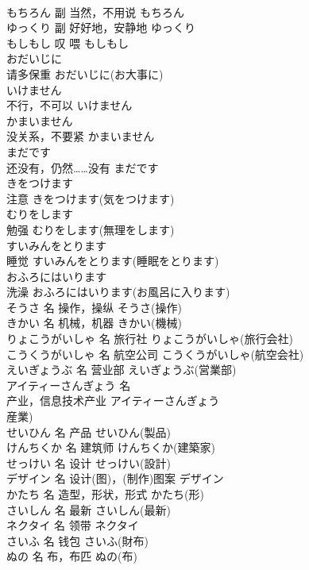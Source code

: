 \documentclass[8pt]{extreport}
\begin{document}
\begin{CJK}{UTF8}{min}
\\	もちろん	副	当然，不用说	もちろん	
\\	ゆっくり	副	好好地，安静地	ゆっくり	
\\	もしもし	叹	喂	もしもし	
\\	おだいじに	
\\	请多保重	おだいじに(お大事に)	
\\	いけません	
\\	不行，不可以	いけません	
\\	かまいません	
\\	没关系，不要紧	かまいません	
\\	まだです	
\\	还没有，仍然……没有	まだです	
\\	きをつけます	
\\	注意	きをつけます(気をつけます)	
\\	むりをします	
\\	勉强	むりをします(無理をします)	
\\	すいみんをとります	
\\	睡觉	すいみんをとります(睡眠をとります)	
\\	おふろにはいります	
\\	洗澡	おふろにはいります(お風呂に入ります)	
\\	そうさ	名	操作，操纵	そうさ(操作)	
\\	きかい	名	机械，机器	きかい(機械)	
\\	りょこうがいしゃ	名	旅行社	りょこうがいしゃ(旅行会社)	
\\	こうくうがいしゃ	名	航空公司	こうくうがいしゃ(航空会社)	
\\	えいぎょうぶ	名	营业部	えいぎょうぶ(営業部)	
\\	アイティーさんぎょう	名	
\\	产业，信息技术产业	アイティーさんぎょう
\\	産業)	
\\	せいひん	名	产品	せいひん(製品)	
\\	けんちくか	名	建筑师	けんちくか(建築家)	
\\	せっけい	名	设计	せっけい(設計)	
\\	デザイン	名	设计(图)，(制作)图案	デザイン	
\\	かたち	名	造型，形状，形式	かたち(形)	
\\	さいしん	名	最新	さいしん(最新)	
\\	ネクタイ	名	领带	ネクタイ	
\\	さいふ	名	钱包	さいふ(財布)	
\\	ぬの	名	布，布匹	ぬの(布)	

\end{CJK}
\end{document}
